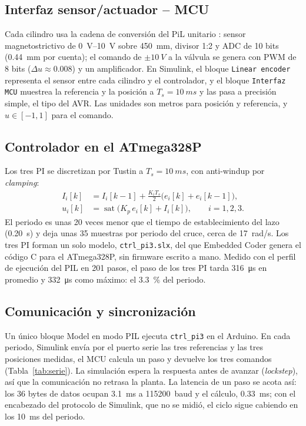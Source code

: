 \documentclass[conference]{IEEEtran}
\begin{document}
\subsection{Interfaz sensor/actuador -- MCU}
Cada cilindro usa la cadena de conversión del PiL unitario \cite{pil_unitario}: sensor magnetostrictivo de \SIrange{0}{10}{V} sobre \SI{450}{mm}, divisor 1:2 y ADC de 10 bits (\SI{0.44}{mm} por cuenta); el comando de $\pm\SI{10}{V}$ a la válvula se genera con PWM de 8 bits ($\Delta u\approx0.008$) y un amplificador. En Simulink, el bloque \texttt{Linear encoder} representa el sensor entre cada cilindro y el controlador, y el bloque \texttt{Interfaz MCU} muestrea la referencia y la posición a $T_s=\SI{10}{ms}$ y las pasa a precisión simple, el tipo del AVR. Las unidades son metros para posición y referencia, y $u\in[-1,1]$ para el comando.

\subsection{Controlador en el ATmega328P}
Los tres PI se discretizan por Tustin a $T_s=\SI{10}{ms}$, con anti-windup por \textit{clamping}:
\begin{equation}
\begin{aligned}
I_i[k] &= I_i[k-1]+\tfrac{K_iT_s}{2}\big(e_i[k]+e_i[k-1]\big),\\
u_i[k] &= \operatorname{sat}\big(K_p\,e_i[k]+I_i[k]\big),\qquad i=1,2,3.
\end{aligned}
\end{equation}
El periodo es unas 20 veces menor que el tiempo de establecimiento del lazo (\SI{0.20}{s}) y deja unas 35 muestras por periodo del cruce, cerca de \SI{17}{rad/s}. Los tres PI forman un solo modelo, \texttt{ctrl\_pi3.slx}, del que Embedded Coder genera el código C para el ATmega328P, sin firmware escrito a mano. Medido con el perfil de ejecución del PIL en 201 pasos, el paso de los tres PI tarda \SI{316}{\micro s} en promedio y \SI{332}{\micro s} como máximo: el \SI{3.3}{\percent} del periodo.

\subsection{Comunicación y sincronización}
Un único bloque Model en modo PIL ejecuta \texttt{ctrl\_pi3} en el Arduino. En cada periodo, Simulink envía por el puerto serie las tres referencias y las tres posiciones medidas, el MCU calcula un paso y devuelve los tres comandos (Tabla~\ref{tab:serie}). La simulación espera la respuesta antes de avanzar (\textit{lockstep}), así que la comunicación no retrasa la planta. La latencia de un paso se acota así: los 36 bytes de datos ocupan \SI{3.1}{ms} a \SI{115200}{baud} y el cálculo, \SI{0.33}{ms}; con el encabezado del protocolo de Simulink, que no se midió, el ciclo sigue cabiendo en los \SI{10}{ms} del periodo.
\end{document}
